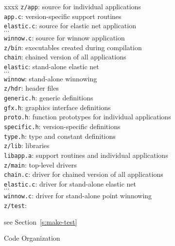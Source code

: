 \begin{table}
\begin{small}\begin{tabbing}
xxxx\=\kill
{\tt{z/app}}: source for individual applications\\
    \> {\tt{app.c}}: version-specific support routines\\
    \> {\tt{elastic.c}}: source for elastic net application\\
    \> \begin{math}\cdots\end{math}\\
    \> {\tt{winnow.c}}: source for winnow application\\
{\tt{z/bin}}: executables created during compilation\\
    \> {\tt{chain}}: chained version of all applications\\
    \> {\tt{elastic}}: stand-alone elastic net\\
    \> \begin{math}\cdots\end{math}\\
    \> {\tt{winnow}}: stand-alone winnowing\\
{\tt{z/hdr}}: header files\\
    \> {\tt{generic.h}}: generic definitions\\
    \> {\tt{gfx.h}}: graphics interface definitions\\
    \> {\tt{proto.h}}: function prototypes for individual applications\\
    \> {\tt{specific.h}}: version-specific definitions\\
    \> {\tt{type.h}}: type and constant definitions\\
{\tt{z/lib}}: libraries\\
    \> {\tt{libapp.a}}: support routines and individual applications\\
{\tt{z/main}}: top-level drivers\\
    \> {\tt{chain.c}}: driver for chained version of all applications\\
    \> {\tt{elastic.c}}: driver for stand-alone elastic net\\
    \> \begin{math}\cdots\end{math}\\
    \> {\tt{winnow.c}}: driver for stand-alone point winnowing\\
{\tt{z/test}}: \\
    \> \begin{em}see Section~\ref{s:make-test}\end{em}
\end{tabbing}\end{small}
\caption{Code Organization\label{t:code-org}}
\end{table}

